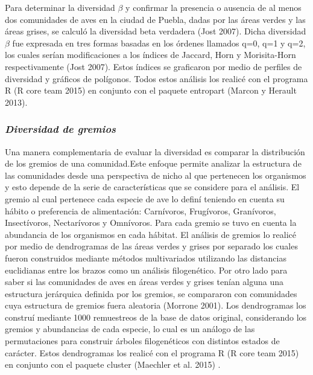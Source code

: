 \documentclass[letterpaper,12pt]{article}
\begin{document}
Para determinar la diversidad $\beta$ y confirmar la presencia o ausencia de al menos dos comunidades de aves en la ciudad de Puebla, dadas por  las áreas verdes y las  áreas grises, se calculó la diversidad beta verdadera (Jost 2007). Dicha  diversidad $\beta$ fue expresada en tres formas basadas en los  órdenes llamados q=0, q=1 y q=2, los cuales serían modificaciones a los índices de Jaccard, Horn y Morisita-Horn respectivamente (Jost 2007).
Estos índices se graficaron por medio de  perfiles de diversidad y gráficos de polígonos. Todos estos análisis los realicé con el programa R (R core team 2015)  en conjunto con el paquete entropart (Marcon y Herault 2013).

\subsubsection{\textit{Diversidad de gremios}}
Una manera complementaria de evaluar la diversidad es comparar la distribución de los gremios de una comunidad.Este enfoque permite analizar la estructura de las comunidades desde una perspectiva de nicho al que pertenecen los organismos y esto depende de la serie de características que se considere para el análisis. El gremio al cual pertenece cada especie de ave lo definí teniendo en cuenta su hábito o preferencia de alimentación: Carnívoros, Frugívoros, Granívoros, Insectívoros, Nectarívoros y Omnívoros. Para cada gremio se tuvo en cuenta la abundancia de los organismos en cada hábitat. El análisis de gremios lo realicé por medio de dendrogramas de las áreas verdes y grises por separado los cuales fueron construidos  mediante métodos multivariados utilizando las distancias euclidianas entre los brazos como un análisis filogenético. Por otro lado para saber si las comunidades de aves en áreas verdes y grises tenían alguna una estructura jerárquica definida por los gremios, se compararon con comunidades cuya estructura de gremios fuera aleatoria (Morrone 2001). Los dendrogramas los construí mediante 1000 remuestreos de la base de datos original, considerando los gremios y abundancias de cada especie, lo cual es un análogo de las permutaciones para construir árboles filogenéticos con distintos estados de carácter. Estos dendrogramas los realicé con el programa R (R core team 2015) en conjunto con el paquete cluster (Maechler et al. 2015) .  
\end{document}
